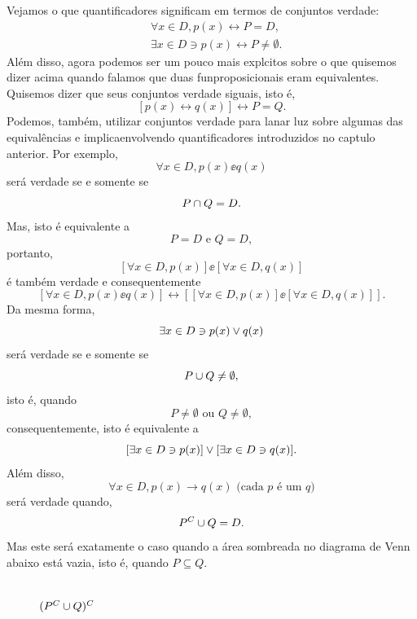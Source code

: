 Vejamos o que quantificadores significam em termos de conjuntos verdade:
\begin{equation*}
 \begin{aligned}
& \forall x \in D, p(x)\leftrightarrow P=D,\\
& \exists x \in D \ni p(x)\leftrightarrow P\neq\emptyset.
 \end{aligned}
\end{equation*}
Al\'em disso, agora podemos ser um pouco mais expl\ih citos sobre o que quisemos dizer acima quando falamos que duas fun\coes proposicionais eram equivalentes. Quisemos dizer que seus conjuntos verdade s\ao iguais, isto \'e,
\[
[p(x)\leftrightarrow q(x)]\leftrightarrow P=Q.
\]
Podemos, tamb\'em, utilizar conjuntos verdade para lan\cc ar luz sobre algumas das equival\^encias e implica\coes envolvendo quantificadores introduzidos no cap\ih tulo anterior. Por exemplo,
\[
\forall x\in D, p(x)\ee q(x)
\] 
ser\'a verdade se e somente se
\[
P\cap Q=D.
\]
Mas, isto \'e equivalente a
\[
P=D \textrm{ e } Q=D,
\]
portanto,
\[
[\forall x \in D, p(x)]\ee[\forall x \in D, q(x)]
\]
\'e tamb\'em verdade e consequentemente
\[
[\forall x\in D, p(x)\ee q(x)]\leftrightarrow[[\forall x \in D, p(x)]\ee[\forall x \in D, q(x)]].
\]
Da mesma forma,
\[
\exists x\in D\ni p(x)\vee q(x)
\]
ser\'a verdade se e somente se
\[
P\cup Q\neq\emptyset,
\]
isto \'e, quando
\[
P\neq\emptyset \textrm{ ou } Q\neq\emptyset,
\]
consequentemente, isto \'e equivalente a 
\[
[\exists x\in D\ni p(x)]\vee[\exists x\in D\ni q(x)].
\]
Al\'em disso,
\[
\forall x\in D, p(x)\to q(x) \textrm{ (cada $p$ \'e um $q$)}
\]
ser\'a verdade quando,
\[
P^C\cup Q=D.
\]
Mas este ser\'a exatamente o caso quando a \'area sombreada no diagrama de Venn abaixo est\'a vazia, isto \'e, quando $P\subseteq Q.$ 

\def\rectangle{(-3,-2) rectangle (5,2)}
\def\firstcircle{(0,0) circle (1.5cm)}
\def\secondcircle{(60:2cm) circle (1.5cm)}
\def\thirdcircle{(0:2cm) circle (1.5cm)}
\begin{figure}[h]
\centering
{}
\\
$(P^C\cup Q)^C$
\end{figure}

